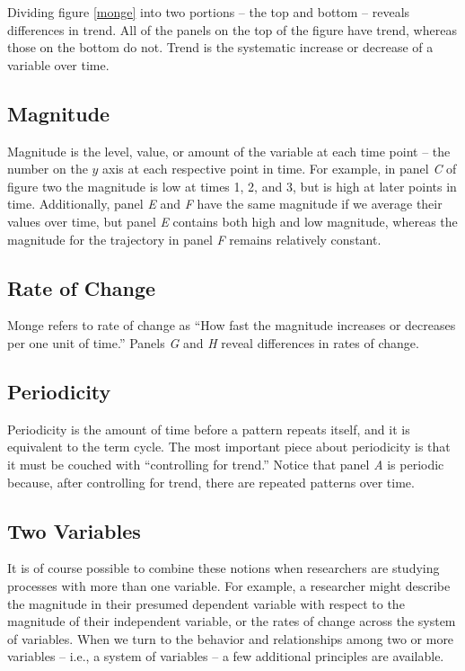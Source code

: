 \documentclass[english,,man]{apa6}
\theoremstyle{definition}
\theoremstyle{definition}
\theoremstyle{definition}
\theoremstyle{remark}
\begin{document}
Dividing figure \ref{monge} into two portions -- the top and bottom --
reveals differences in trend. All of the panels on the top of the figure
have trend, whereas those on the bottom do not. Trend is the systematic
increase or decrease of a variable over time.

\hypertarget{magnitude}{%
\subsection{Magnitude}\label{magnitude}}

Magnitude is the level, value, or amount of the variable at each time
point -- the number on the \(y\) axis at each respective point in time.
For example, in panel \emph{C} of figure two the magnitude is low at
times 1, 2, and 3, but is high at later points in time. Additionally,
panel \emph{E} and \emph{F} have the same magnitude if we average their
values over time, but panel \emph{E} contains both high and low
magnitude, whereas the magnitude for the trajectory in panel \emph{F}
remains relatively constant.

\hypertarget{rate-of-change}{%
\subsection{Rate of Change}\label{rate-of-change}}

Monge refers to rate of change as \enquote{How fast the magnitude
increases or decreases per one unit of time.} Panels \emph{G} and
\emph{H} reveal differences in rates of change.

\hypertarget{periodicity}{%
\subsection{Periodicity}\label{periodicity}}

Periodicity is the amount of time before a pattern repeats itself, and
it is equivalent to the term cycle. The most important piece about
periodicity is that it must be couched with \enquote{controlling for
trend.} Notice that panel \emph{A} is periodic because, after
controlling for trend, there are repeated patterns over time.

\hypertarget{two-variables}{%
\subsection{Two Variables}\label{two-variables}}

It is of course possible to combine these notions when researchers are
studying processes with more than one variable. For example, a
researcher might describe the magnitude in their presumed dependent
variable with respect to the magnitude of their independent variable, or
the rates of change across the system of variables. When we turn to the
behavior and relationships among two or more variables -- i.e., a system
of variables -- a few additional principles are available.
\end{document}
